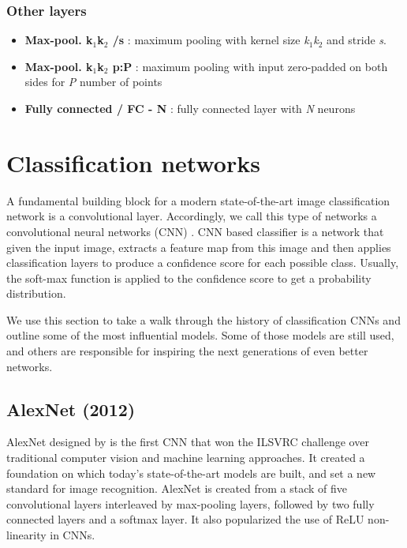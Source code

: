 \subsubsection*{Other layers}
\begin{itemize}
    \item \textbf{Max-pool. k$_1$\x k$_2$ /s} : maximum pooling with kernel size \textit{k$_1$\x k$_2$} and stride \textit{s}.
    
    \item \textbf{Max-pool. k$_1$\x k$_2$ p:P} : maximum pooling with
 input zero-padded on both sides for \textit{P} number of points
 
    \item \textbf{Fully connected / FC - N} : fully connected layer with \textit{N} neurons
\end{itemize}

\section{Classification networks}
\label{sec:clsnets}
A fundamental building block for a modern state-of-the-art image classification network is a convolutional layer. Accordingly, we call this type of networks a convolutional neural networks (CNN) \cite[ch.~9]{bib:dlbook}. CNN based classifier is a network that given the input image, extracts a feature map from this image and then applies classification layers to produce a confidence score for each possible class. Usually, the soft-max function is applied to the confidence score to get a probability distribution.

We use this section to take a walk through the history of classification CNNs and outline some of the most influential models. Some of those models are still used, and others are responsible for inspiring the next generations of even better networks.

\subsection{AlexNet (2012)}
AlexNet designed by \citeauthor{bib:alexnet} \cite{bib:alexnet} is the first CNN that won the ILSVRC challenge over traditional computer vision and machine learning approaches. It created a foundation on which today's state-of-the-art models are built, and set a new standard for image recognition. AlexNet is created from a stack of five convolutional layers interleaved by max-pooling layers, followed by two fully connected layers and a softmax layer. It also popularized the use of ReLU non-linearity in CNNs.

